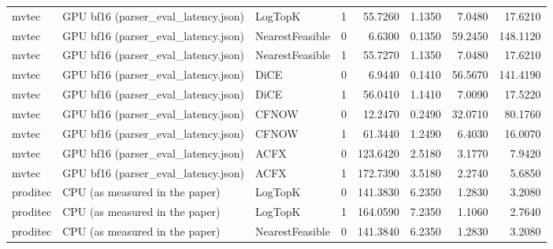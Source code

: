 \begin{tabular}{lllrrrrr}
   mvtec & GPU bf16 (parser\_eval\_latency.json) &         LogTopK &            1 &        55.7260 &                   1.1350 &                    7.0480 &                    17.6210 \\
   mvtec & GPU bf16 (parser\_eval\_latency.json) & NearestFeasible &            0 &         6.6300 &                   0.1350 &                   59.2450 &                   148.1120 \\
   mvtec & GPU bf16 (parser\_eval\_latency.json) & NearestFeasible &            1 &        55.7270 &                   1.1350 &                    7.0480 &                    17.6210 \\
   mvtec & GPU bf16 (parser\_eval\_latency.json) &            DiCE &            0 &         6.9440 &                   0.1410 &                   56.5670 &                   141.4190 \\
   mvtec & GPU bf16 (parser\_eval\_latency.json) &            DiCE &            1 &        56.0410 &                   1.1410 &                    7.0090 &                    17.5220 \\
   mvtec & GPU bf16 (parser\_eval\_latency.json) &           CFNOW &            0 &        12.2470 &                   0.2490 &                   32.0710 &                    80.1760 \\
   mvtec & GPU bf16 (parser\_eval\_latency.json) &           CFNOW &            1 &        61.3440 &                   1.2490 &                    6.4030 &                    16.0070 \\
   mvtec & GPU bf16 (parser\_eval\_latency.json) &            ACFX &            0 &       123.6420 &                   2.5180 &                    3.1770 &                     7.9420 \\
   mvtec & GPU bf16 (parser\_eval\_latency.json) &            ACFX &            1 &       172.7390 &                   3.5180 &                    2.2740 &                     5.6850 \\
proditec &      CPU (as measured in the paper) &         LogTopK &            0 &       141.3830 &                   6.2350 &                    1.2830 &                     3.2080 \\
proditec &      CPU (as measured in the paper) &         LogTopK &            1 &       164.0590 &                   7.2350 &                    1.1060 &                     2.7640 \\
proditec &      CPU (as measured in the paper) & NearestFeasible &            0 &       141.3840 &                   6.2350 &                    1.2830 &                     3.2080 \\

\end{tabular}
